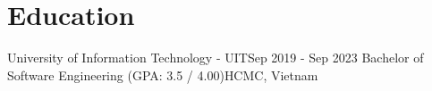 \section{Education}
    \resumeSubHeadingListStart

    \resumeSubheading
    {University of Information Technology - UIT}{Sep 2019 - Sep 2023}
    {Bachelor of Software Engineering (GPA: 3.5 / 4.00)}{HCMC, Vietnam}

    \resumeSubHeadingListEnd